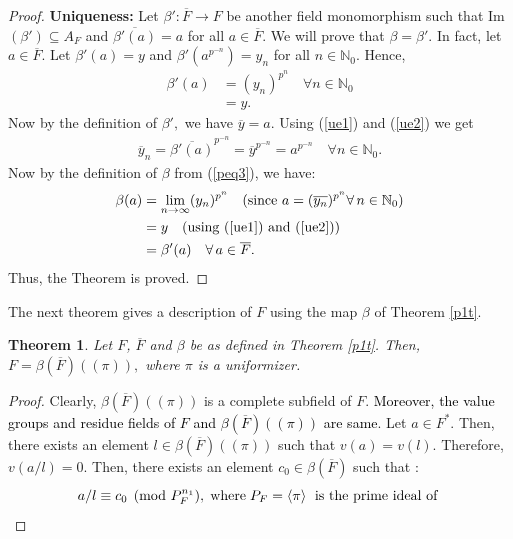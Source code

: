 \documentclass[times,10pt]{amsart}
\newcommand{\N}{\ensuremath{\mathbb{N}}}
\newtheorem{thm}{Theorem}[section]
\begin{document}
{\begin{proof}
\textbf{Uniqueness:} 
 Let $\beta': \overline{F}\xrightarrow{} F$ be    another field monomorphism such that   Im$(\beta')\subseteq A_F $ and $\overline{\beta'(a)} = a$ for all $a\in \overline{F}.$  We will prove that $ \beta=\beta'$. In fact, let $a\in \overline{F}.$  Let $ \beta'( a)= y$ and $ \beta'( a^{p^{-n}})= y_n$ for all $n\in \mathbb{N}_0$. 
Hence, \begin{align}\label{ue1} \beta'( a)&= ({y}_n)^{p^n}\quad \forall n\in \N_0\\\label{ue2}&=y.\end{align} Now by the definition of $\beta',$  we have $ \overline{y}=a$. Using (\ref{ue1}) and (\ref{ue2}) we get \begin{align*}
    \overline{y}_n= \overline{ \beta'(a)}^{p^{-n}}= {\overline{y}}^{p^{-n}}= a^{p^{-n}}  \quad \forall n\in \N_0.
\end{align*} Now by the definition of $ \beta$ from (\ref{peq3}), we have:\begin{align*} \beta(a)&= \lim_{n\to \infty} ({y_n})^{p^n}\quad \text{(since ${a}=(\overline{y_n})^{p^n} \forall\, n\in \mathbb{N}_0$)} \\ &= y\quad \text{(using (\ref{ue1}) and (\ref{ue2}))} \\&= \beta'(a) \quad \forall\, a\in \overline{F}.\end{align*}Thus, the Theorem is proved.
\end{proof}
 The next theorem gives a description of  $F$ using the map $\beta $ of Theorem \ref{p1t}.
\begin{thm}\label{p2t}
    Let $F$, $\overline{F}$ and $\beta$ be as defined in Theorem \ref{p1t}. Then, $ F=\beta(\overline{F})(( \pi)),$ where $\pi$ is a uniformizer.
\end{thm}
\begin{proof}
    Clearly, $\beta(\overline{F})((\pi)) $ is a complete subfield  of $F.$  \textcolor{black}{Moreover, the value groups and residue fields of
 $ F$ and $\beta(\overline{F})((\pi))$ are  same}. Let $ a\in F^*$.  Then, there exists an element $l\in \beta(\overline{F})((\pi))$  such that $ v(a)=v(l).$ Therefore, $v(a/l)=0.$ Then, there exists an element $ c_0\in \beta( \overline{F})$ such that : $$ a/l\equiv c_0\pmod{P_F^{n_1}}, \hspace{1mm}\text{where}\hspace{1mm} P_F=\langle \pi\rangle\hspace{1mm}\text{ is the prime ideal of} \hspace{1mm}
$$
\end{proof}}
\end{document}
